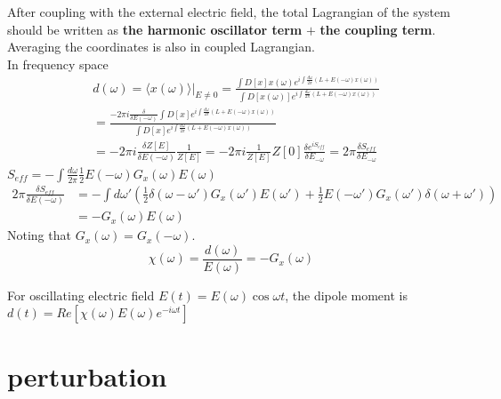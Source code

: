 \documentclass[a4paper,11pt]{article}
\begin{document}
\begin{enumerate}
\begin{equation*}
  \end{equation*}
  After coupling with the external electric field, the total Lagrangian of the system should be written as \textbf{the harmonic oscillator term} $+$ \textbf{the coupling term}. Averaging the coordinates is also in coupled Lagrangian.\\
  In frequency space
  \begin{equation*}
    \begin{split}
       &\left.d(\omega)=\langle x(\omega)\rangle\right|_{E\neq0}=\frac{\int D[x]x(\omega)e^{i\int\frac{d\omega}{2\pi}(L+E(-\omega)x(\omega))}}{\int D[x(\omega)]e^{i\int\frac{d\omega}{2\pi}(L+E(-\omega)x(\omega))}}\\
         &=\frac{-2\pi i\frac{\delta}{\delta E(-\omega)}\int D[x]e^{i\int\frac{d\omega}{2\pi}(L+E(-\omega)x(\omega))}}{\int D[x]e^{i\int\frac{d\omega}{2\pi}(L+E(-\omega)x(\omega))}}\\
         &=-2\pi i\frac{\delta Z[E]}{\delta E(-\omega)}\frac{1}{Z[E]}=-2\pi i\frac{1}{Z[E]}Z[0]\frac{\delta e^{iS_{eff}}}{\delta E_{-\omega}}=2\pi\frac{\delta S_{eff}}{\delta E_{-\omega}}
    \end{split}
  \end{equation*}
  $S_{eff}=-\int\frac{d\omega}{2\pi}\frac{1}{2}E(-\omega)G_x(\omega)E(\omega)$
  \begin{equation*}
    \begin{split}
       2\pi\frac{\delta S_{eff}}{\delta E(-\omega)}&=-\int d\omega'\left(\frac{1}{2}\delta(\omega-\omega')G_x(\omega')E(\omega')+\frac{1}{2}E(-\omega')G_x(\omega')\delta(\omega+\omega')\right)\\
         &=-G_x(\omega)E(\omega)
    \end{split}
  \end{equation*}
  Noting that $G_x(\omega)=G_x(-\omega)$.
  \begin{equation*}
    \chi(\omega)=\frac{d(\omega)}{E(\omega)}=-G_x(\omega)
  \end{equation*}
\end{enumerate}
For oscillating electric field $E(t)=E(\omega)\cos\omega t$, the dipole moment is $d(t)=Re[\chi(\omega)E(\omega)e^{-i\omega t}]$
\section{perturbation}
\end{document}
